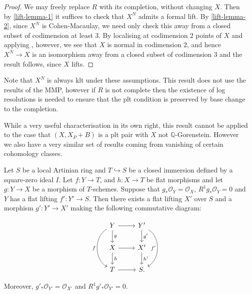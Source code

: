 \documentclass[a4paper,12pt]{book}
\newcommand{\ox}[1][X]{\mathcal{O}_{#1}}
\begin{document}
\begin{proof}

	We may freely replace $R$ with its completion, without changing $X$. Then by \autoref{lift-lemma-1} it suffices to check that $X^{N}$ admits a formal lift. By \autoref{lift-lemma-2}, since $X^{N}$ is Cohen-Macaulay, we need only check this away from a closed subset of codimension at least $3$. By localising at codimension $2$ points of $X$ and applying \cite{}, however, we see that $X$ is normal in codimension $2$, and hence $X^{N} \to X$ is an isomorphism away from a closed subset of codimension $3$ and the result follows, since $X$ lifts.
	
\end{proof}

Note that $X^{N}$ is always klt under these assumptions. This result does not use the results of the MMP, however if $R$ is not complete then the existence of log resolutions is needed to ensure that the plt condition is preserved by base change to the completion.

While a very useful characterisation in its own right, this result cannot be applied to the case that $(X,X_{P}+B)$ is a plt pair with $X$ not $\mathbb{Q}$-Gorenstein. However we also have a very similar set of results coming from vanishing of certain cohomology classes. 

\begin{proposition}\label{push-lift}
	Let $S$ be a local Artinian ring and $T \hookrightarrow S$ be a closed immersion defined by a square-zero ideal $I$.  Let $f\colon Y \to T$, and $h\colon X \to T$ be flat morphisms and let $g\colon Y \to X$ be a morphism of $T$-schemes. 
	Suppose that $g_{*} \ox[Y]=\ox$, $R^{1}g_{*} \ox[Y] = 0$ and $Y$ has a flat lifting $f' \colon Y' \to S$. Then there exists a flat lifting $X'$ over $S$ and a morphism $g' \colon Y' \to X'$ making the following commutative diagram:
	
	\[\begin{tikzcd}
	Y \arrow[r] \arrow[d, "g"]  \arrow[bend right=60,swap, "f"]{dd}
	& Y' \arrow[d, "g'"] \arrow[bend left=60,swap, "f'"]{dd} \\
	X \arrow[d, "h"] \arrow[r] & X' \arrow[d, "h'"] \\
	T \arrow[r]                        & S    .                     
	\end{tikzcd}\]
	
	Moreover,  $g'_{*} \ox[Y']=\ox[X']$ and $R^{1}g'_{*} \ox[Y'] = 0$.
\end{proposition}
\end{document}
